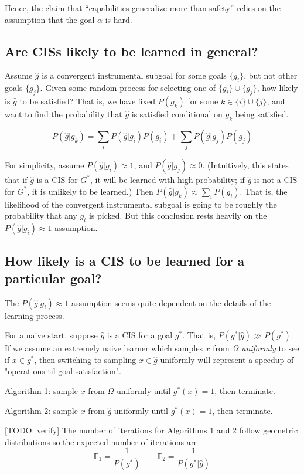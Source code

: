 \documentclass{article}
\begin{document}
Hence, the claim that ``capabilities generalize more than safety'' relies on the assumption that the goal $\alpha$ is hard.

\subsection{Are CISs likely to be learned in general?}\label{CIS-general}
Assume $\hat{g}$ is a convergent instrumental subgoal for some goals $\{g_i\}$, but not other goals $\{g_j\}$. Given some random process for selecting one of $\{g_i\} \cup \{g_j\}$, how likely is $\hat{g}$ to be satisfied? That is, we have fixed $P(g_k)$ for some $k \in \{i\} \cup \{j\}$, and want to find the probability that $\hat{g}$ is satisfied conditional on $g_k$ being satisfied.

\[
P(\hat{g}|g_k)=\sum_i P(\hat{g}|g_i)P(g_i) + \sum_j P(\hat{g}|g_j)P(g_j)
\]

For simplicity, assume $P(\hat{g}|g_i) \approx 1$, and $P(\hat{g}|g_j) \approx 0$. (Intuitively, this states that if $\hat{g}$ is a CIS for $G^*$, it will be learned with high probability; if $\hat{g}$ is not a CIS for $G^*$, it is unlikely to be learned.) Then $P(\hat{g}|g_k) \approx \sum_i P(g_i)$. That is, the likelihood of the convergent instrumental subgoal is going to be roughly the probability that any $g_i$ is picked. But this conclusion rests heavily on the $P(\hat{g}|g_i) \approx 1$ assumption.

\subsection{How likely is a CIS to be learned for a particular goal?}
The $P(\hat{g}|g_i) \approx 1$ assumption seems quite dependent on the details of the learning process.

For a naive start, suppose $\hat{g}$ is a CIS for a goal $g^*$. That is, $P(g^*|\hat{g})\gg P(g^*)$. If we assume an extremely naive learner which samples $x$ from $\Omega$ \textit{uniformly} to see if $x \in g^*$, then switching to sampling $x \in \hat{g}$ uniformly will represent a speedup of "operations til goal-satisfaction".

Algorithm 1: sample $x$ from $\Omega$ uniformly until $g^*(x)=1$, then terminate.

Algorithm 2: sample $x$ from $\hat{g}$ uniformly until $g^*(x)=1$, then terminate.

[TODO: verify] The number of iterations for Algorithms 1 and 2 follow geometric distributions so the expected number of iterations are 
\[
\mathbb{E}_1 = \frac{1}{P(g^*)} \qquad \mathbb{E}_2 = \frac{1}{P(g^*|\hat{g})}    
\]
\end{document}
